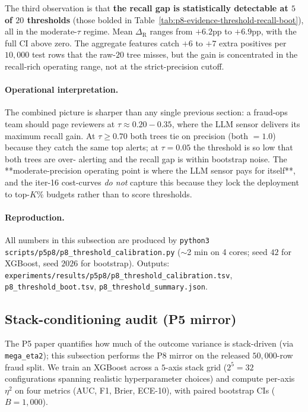 \documentclass{article}
\providecommand{\tableref}[1]{Table~\ref{#1}}
\begin{document}
The third observation is that \textbf{the recall gap is statistically
detectable at $5$ of $20$ thresholds} (those bolded in
\tableref{tab:p8-evidence-threshold-recall-boot}), all in the
moderate-$\tau$ regime. Mean $\Delta_\text{R}$ ranges from $+6.2$pp
to $+6.9$pp, with the full CI above zero. The aggregate features
catch $+6$ to $+7$ extra positives per $10{,}000$ test rows that the
raw-$20$ tree misses, but the gain is concentrated in the recall-rich
operating range, not at the strict-precision cutoff.

\paragraph{Operational interpretation.} The combined picture is
sharper than any single previous section: a fraud-ops team should
page reviewers at $\tau \approx 0.20{-}0.35$, where the LLM sensor
delivers its maximum recall gain. At $\tau \ge 0.70$ both trees tie
on precision (both $= 1.0$) because they catch the same top alerts;
at $\tau = 0.05$ the threshold is so low that both trees are over-
alerting and the recall gap is within bootstrap noise. The
**moderate-precision operating point is where the LLM sensor pays for
itself**, and the iter-16 cost-curves \emph{do not} capture this
because they lock the deployment to top-$K$\% budgets rather than to
score thresholds.

\paragraph{Reproduction.} All numbers in this subsection are produced
by \texttt{python3 scripts/p5p8/p8\_threshold\_calibration.py}
($\sim$2 min on 4 cores; seed $42$ for XGBoost, seed $2026$ for
bootstrap). Outputs:
\texttt{experiments/results/p5p8/p8\_threshold\_calibration.tsv},
\texttt{p8\_threshold\_boot.tsv},
\texttt{p8\_threshold\_summary.json}.

\subsection{Stack-conditioning audit (P5 mirror)}

The P5 paper quantifies how much of the outcome variance is stack-driven
(via \texttt{mega\_eta2}); this subsection performs the P8 mirror on the
released $50{,}000$-row fraud split. We train an XGBoost across a
$5$-axis stack grid ($2^5 = 32$ configurations spanning realistic
hyperparameter choices) and compute per-axis $\eta^2$ on four metrics
(AUC, F1, Brier, ECE-10), with paired bootstrap CIs ($B{=}1{,}000$).
\end{document}
